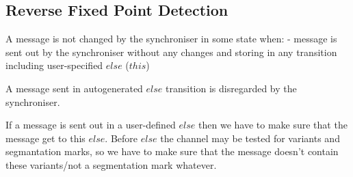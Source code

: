 %


%


    \subsection{Reverse Fixed Point Detection\label{rfp_detect}}
A message is not changed by the synchroniser in some state when:
- message is sent out by the synchroniser without any changes and storing in any transition including user-specified $else$ ($this$)

A message sent in autogenerated $else$ transition is disregarded by the synchroniser.

If a message is sent out in a user-defined $else$ then we have to make sure that the message get to this $else$. Before $else$ the channel may be tested for variants and segmantation marks, so we have to make sure that the message doesn't contain these variants/not a segmentation mark whatever.


